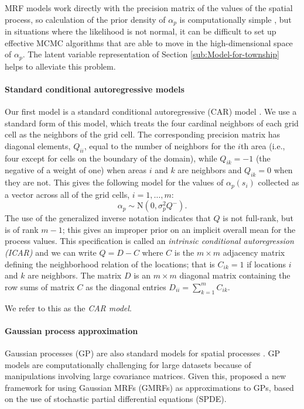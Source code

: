 \documentclass[12pt]{article}\usepackage[]{graphicx}\usepackage[]{color}
\begin{document}
MRF models work directly with the precision matrix of the values of
the spatial process, so calculation of the prior density of $\alpha_{p}$
is computationally simple \citep{Rue:Held:2005}, but in situations
where the likelihood is not normal, it can be difficult to set up
effective MCMC algorithms that are able to move in the high-dimensional
space of $\alpha_{p}$. The latent variable representation of Section
\ref{sub:Model-for-township} helps to alleviate this problem.


\paragraph{Standard conditional autoregressive models}

Our first model is a standard conditional autoregressive (CAR) model
\citep{Bane:etal:2003}. We use a standard form of this model, which
treats the four cardinal neighbors of each grid cell as the neighbors
of the grid cell. The corresponding precision matrix has diagonal
elements, $Q_{ii}$, equal to the number of neighbors for the $i$th
area (i.e., four except for cells on the boundary of the domain),
while $Q_{ik}=-1$ (the negative of a weight of one) when areas $i$
and $k$ are neighbors and $Q_{ik}=0$ when they are not. This gives
the following model for the values of $\alpha_{p}(s_{i})$ collected
as a vector across all of the grid cells, $i=1,\ldots,m$: 
\[
\alpha_{p}\sim\mbox{N}(0,\sigma_{p}^{2}Q^{-}).
\]
The use of the generalized inverse notation indicates that $Q$ is
not full-rank, but is of rank $m-1$; this gives an improper prior
on an implicit overall mean for the process values. This specification
is called an \textit{intrinsic conditional autoregression (ICAR)}
and we can write $Q=D-C$ where $C$ is the $m\times m$ adjacency
matrix defining the neighborhood relation of the locations; that is
$C{}_{ik}=1$ if locations $i$ and $k$ are neighbors. The matrix
$D$ is an $m\times m$ diagonal matrix containing the row sums of
matrix $C$ as the diagonal entries $D{}_{ii}={\displaystyle \sum_{k=1}^{m}C{}_{ik}}.$

We refer to this as the \emph{CAR model}.


\paragraph{Gaussian process approximation}

Gaussian processes (GP) are also standard models for spatial processes \citep{Bane:etal:2003}.
GP models are computationally challenging for large datasets because
of manipulations involving large covariance matrices. Given this,
\cite{Lind:etal:2011} proposed a new framework for using Gaussian
MRFs (GMRFs) as approximations to GPs, based on the use of stochastic
partial differential equations (SPDE).
\end{document}

